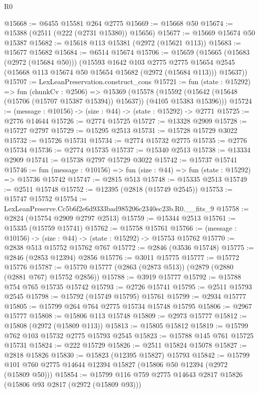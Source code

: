 \begin{lexlean}{R0}
\begin{coremodule}
@15668 := @6455 @15581 @264 @2775
@15669 := @15668 @50
@15674 := @15388 (@2511 (@222 (@2731 @15380)) @15656)
@15677 := @15669 @15674 @50 @15387
@15682 := @15618 @113 @15381 (@2972 (@15621 @113))
@15683 := @15677 @15682
@15684 := @6514 @15674
@15706 := @15659
    (@15665
      (@15683 (@2972 (@15684 @50)))
      (@15593
        @1642
        @103
        @2775
        @2775
        @15654
        @2545
        (@15668 @113 @15674 @50 @15654 @15682 (@2972 (@15684 @113)))
        @15637))
@15707 := LexLeanPreservation.construct_cons
@15721 := fun (state : @15292) =>
  fun (chunkCv : @2506) =>
  @15369
    (@15578 (@15592 (@15642 (@15648 (@15706 (@15707 @15387 @15394)) @15637)) (@4105 @15383 @15396)))
@15724 := (message : @10156) -> (size : @44) -> (state : @15292) -> @2771
@15725 := @2776 @14644
@15726 := @2774 @15725
@15727 := @13328 @2909
@15728 := @15727 @2797
@15729 := @15295 @2513
@15731 := @15728 @15729 @3022
@15732 := @15726 @15731
@15734 := @2774 @15732 @2775
@15735 := @2776 @15734
@15736 := @2774 @15735
@15737 := @15340 @2513
@15738 := @13334 @2909
@15741 := @15738 @2797 @15729 @3022
@15742 := @15737 @15741
@15746 := fun (message : @10156) => fun (size : @44) => fun (state : @15292) => @15736 @15742
@15747 := @2815 @513
@15748 := @15335 @2513
@15749 := @2511 @15748
@15752 := @12395 (@2818 (@15749 @2545))
@15753 := @15747 @15752
@15754 := LexLeanPreserve.Cc5b6f2e6d9333bad985206c2340ec23b.R0.__fits_9
@15758 := @2824 (@15754 @2909 @2797 @2513)
@15759 := @15344 @2513
@15761 := @15335 (@15759 @15741)
@15762 := @15758 @15761
@15766 := (message : @10156) -> (size : @44) -> (state : @15292) -> @15753 @15762
@15770 := @2838 @513 @15752 @15762 @767
@15772 := @2846 (@3536 @15748)
@15775 := @2846 (@2853 @12394) @2856
@15776 := @3011 @15775
@15777 := @15772 @15776
@15787 := @15770 @15777 (@2863 (@2873 @513)) (@2879 (@2880 (@2881 @767) @15752 @2856))
@15788 := @3919 @15777
@15792 := @15788 @754 @765 @15735 @15742
@15793 := @2726 @15741
@15795 := @2511 @15793 @2545
@15798 := @15792 (@15749 @15795) @15761
@15799 := @2934 @15777
@15805 := @15799 @264 @764 @2775 @15734 @15748 @15795
@15806 := @2967 @15777
@15808 := @15806 @113 @15748
@15809 := @2973 @15777
@15812 := @15808 (@2972 (@15809 @113))
@15813 := @15805 @15812
@15819 := @15799 @762 @103 @15732 @2775 @15793 @2545
@15823 := @15788 @145 @761 @15725 @15731
@15824 := @222 @15729
@15826 := @2511 @15824 @15078
@15827 := @2818 @15826
@15830 := @15823 (@12395 @15827) @15793
@15842 := @15799 @101 @760 @2775 @14644 @12394 @15827 (@15806 @50 @12394 (@2972 (@15809 @50)))
@15854 := @15799 @116 @759 @2775 @14643 @2817 @15826 (@15806 @93 @2817 (@2972 (@15809 @93)))

\end{coremodule}
\end{lexlean}
